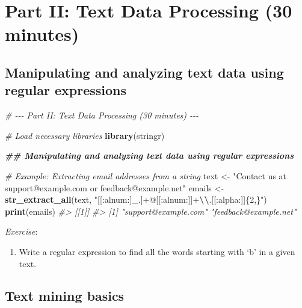 \documentclass[
]{book}
\newenvironment{Shaded}{\begin{snugshade}}{\end{snugshade}}
\newcommand{\CommentTok}[1]{\textcolor[rgb]{0.56,0.35,0.01}{\textit{#1}}}
\newcommand{\DocumentationTok}[1]{\textcolor[rgb]{0.56,0.35,0.01}{\textbf{\textit{#1}}}}
\newcommand{\FunctionTok}[1]{\textcolor[rgb]{0.13,0.29,0.53}{\textbf{#1}}}
\newcommand{\NormalTok}[1]{#1}
\newcommand{\OtherTok}[1]{\textcolor[rgb]{0.56,0.35,0.01}{#1}}
\newcommand{\SpecialCharTok}[1]{\textcolor[rgb]{0.81,0.36,0.00}{\textbf{#1}}}
\newcommand{\StringTok}[1]{\textcolor[rgb]{0.31,0.60,0.02}{#1}}
\providecommand{\tightlist}{%
  \setlength{\itemsep}{0pt}\setlength{\parskip}{0pt}}
\begin{document}
\chapter*{Part II: Text Data Processing (30 minutes)}\label{part-ii-text-data-processing-30-minutes}

\section*{Manipulating and analyzing text data using regular expressions}\label{manipulating-and-analyzing-text-data-using-regular-expressions}

\begin{Shaded}
\begin{Highlighting}[]
\CommentTok{\# {-}{-}{-} Part II: Text Data Processing (30 minutes) {-}{-}{-}}

\CommentTok{\# Load necessary libraries}
\FunctionTok{library}\NormalTok{(stringr)}

\DocumentationTok{\#\# Manipulating and analyzing text data using regular expressions}

\CommentTok{\# Example: Extracting email addresses from a string}
\NormalTok{text }\OtherTok{\textless{}{-}} \StringTok{"Contact us at support@example.com or feedback@example.net"}
\NormalTok{emails }\OtherTok{\textless{}{-}} \FunctionTok{str\_extract\_all}\NormalTok{(text, }\StringTok{"[[:alnum:]\_.]+@[[:alnum:]]+}\SpecialCharTok{\textbackslash{}\textbackslash{}}\StringTok{.[[:alpha:]]\{2,\}"}\NormalTok{)}
\FunctionTok{print}\NormalTok{(emails)}
\CommentTok{\#\textgreater{} [[1]]}
\CommentTok{\#\textgreater{} [1] "support@example.com"  "feedback@example.net"}
\end{Highlighting}
\end{Shaded}

\emph{Exercise}:

\begin{enumerate}
\def\labelenumi{\arabic{enumi}.}
\tightlist
\item
  Write a regular expression to find all the words starting with `b' in a given text.
\end{enumerate}

\section*{Text mining basics}\label{text-mining-basics}
\end{document}
